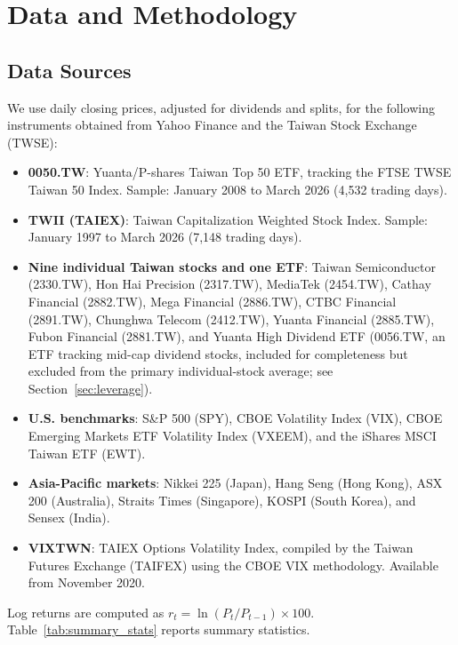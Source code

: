 
\section{Data and Methodology}
\label{sec:data}

\subsection{Data Sources}

We use daily closing prices, adjusted for dividends and splits, for the following instruments obtained from Yahoo Finance and the Taiwan Stock Exchange (TWSE):

\begin{itemize}
    \item \textbf{0050.TW}: Yuanta/P-shares Taiwan Top 50 ETF, tracking the FTSE TWSE Taiwan 50 Index. Sample: January 2008 to March 2026 (4,532 trading days).
    \item \textbf{TWII (TAIEX)}: Taiwan Capitalization Weighted Stock Index. Sample: January 1997 to March 2026 (7,148 trading days).
    \item \textbf{Nine individual Taiwan stocks and one ETF}: Taiwan Semiconductor (2330.TW), Hon Hai Precision (2317.TW), MediaTek (2454.TW), Cathay Financial (2882.TW), Mega Financial (2886.TW), CTBC Financial (2891.TW), Chunghwa Telecom (2412.TW), Yuanta Financial (2885.TW), Fubon Financial (2881.TW), and Yuanta High Dividend ETF (0056.TW, an ETF tracking mid-cap dividend stocks, included for completeness but excluded from the primary individual-stock average; see Section~\ref{sec:leverage}).
    \item \textbf{U.S. benchmarks}: S\&P 500 (SPY), CBOE Volatility Index (VIX), CBOE Emerging Markets ETF Volatility Index (VXEEM), and the iShares MSCI Taiwan ETF (EWT).
    \item \textbf{Asia-Pacific markets}: Nikkei 225 (Japan), Hang Seng (Hong Kong), ASX 200 (Australia), Straits Times (Singapore), KOSPI (South Korea), and Sensex (India).
    \item \textbf{VIXTWN}: TAIEX Options Volatility Index, compiled by the Taiwan Futures Exchange (TAIFEX) using the CBOE VIX methodology. Available from November 2020.
\end{itemize}

Log returns are computed as $r_t = \ln(P_t / P_{t-1}) \times 100$. Table~\ref{tab:summary_stats} reports summary statistics.

